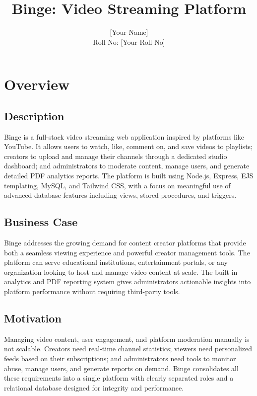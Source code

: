\documentclass[a4paper, twoside]{article}
\title{Binge: Video Streaming Platform}
\author{[Your Name] \\ Roll No: [Your Roll No]}
\begin{document}

\setcounter{page}{1}

\setcounter{tocdepth}{3}
\tableofcontents
{}

\clearpage
\listoftables
{}
\clearpage
\listoffigures
{}
\clearpage
\singlespacing
{}
\setcounter{page}{1}

\section{Overview}

\subsection{Description}
Binge is a full-stack video streaming web application inspired by platforms like YouTube. It allows users to watch, like, comment on, and save videos to playlists; creators to upload and manage their channels through a dedicated studio dashboard; and administrators to moderate content, manage users, and generate detailed PDF analytics reports. The platform is built using Node.js, Express, EJS templating, MySQL, and Tailwind CSS, with a focus on meaningful use of advanced database features including views, stored procedures, and triggers.

\subsection{Business Case}
Binge addresses the growing demand for content creator platforms that provide both a seamless viewing experience and powerful creator management tools. The platform can serve educational institutions, entertainment portals, or any organization looking to host and manage video content at scale. The built-in analytics and PDF reporting system gives administrators actionable insights into platform performance without requiring third-party tools.

\subsection{Motivation}
Managing video content, user engagement, and platform moderation manually is not scalable. Creators need real-time channel statistics; viewers need personalized feeds based on their subscriptions; and administrators need tools to monitor abuse, manage users, and generate reports on demand. Binge consolidates all these requirements into a single platform with clearly separated roles and a relational database designed for integrity and performance.
\end{document}
